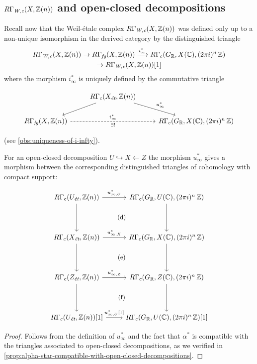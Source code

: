 \subsection*{$R\Gamma_\text{\it W,c} (X, \mathbb{Z} (n))$
  and open-closed decompositions}

Recall now that the Weil-étale complex $R\Gamma_\text{\it W,c} (X, \mathbb{Z} (n))$ was
defined only up to a non-unique isomorphism in the derived category by the
distinguished triangle
\begin{multline*}
  R\Gamma_\text{\it W,c} (X, \mathbb{Z} (n)) \to
  R\Gamma_\text{\it fg} (X, \mathbb{Z} (n)) \xrightarrow{i_\infty^*}
  R\Gamma_c (G_{\mathbb{R}}, X (\mathbb{C}), (2\pi i)^n\,\mathbb{Z}) \\
  \to R\Gamma_\text{\it W,c} (X, \mathbb{Z} (n)) [1]
\end{multline*}
where the morphism $i_\infty^*$ is uniquely defined by the commutative triangle

\[ \begin{tikzcd}
    & R\Gamma_c (X_\text{\it ét}, \ZZ (n))\ar{dl}\ar{dr}{u_\infty^*} \\
    R\Gamma_\text{\it fg} (X, \ZZ (n))\ar[dashed]{rr}{i_\infty^*}[swap]{\exists !} & & R\Gamma_c (G_\RR, X (\CC), (2\pi i)^n\,\ZZ)
  \end{tikzcd} \]

\noindent (see \ref{obs:uniqueness-of-i-infty}).

\begin{lemma}
  \label{eqn:u-infty-and-open-closed-triangles}
  For an open-closed decomposition $U \hookrightarrow X \leftarrow Z$ the
  morphism $u_\infty^*$ gives a morphism between the corresponding distinguished
  triangles of cohomology with compact support:

  \begin{equation}
    \label{eqn:u-infty-morphism-of-triangles}
    \begin{tikzcd}[row sep=4em]
      R\Gamma_c (U_\text{\it ét}, \ZZ (n))\ar{r}{u_{\infty,U}^*}\ar{d}\ar[phantom]{dr}{\text{\rm\small (d)}} & R\Gamma_c (G_\RR, U (\CC), (2\pi i)^n\,\ZZ)\ar{d} \\
      R\Gamma_c (X_\text{\it ét}, \ZZ (n))\ar{r}{u_{\infty,X}^*}\ar{d}\ar[phantom]{dr}{\text{\rm\small (e)}} & R\Gamma_c (G_\RR, X (\CC), (2\pi i)^n\,\ZZ)\ar{d} \\
      R\Gamma_c (Z_\text{\it ét}, \ZZ (n))\ar{r}{u_{\infty,Z}^*}\ar{d}\ar[phantom]{dr}{\text{\rm\small (f)}} & R\Gamma_c (G_\RR, Z (\CC), (2\pi i)^n\,\ZZ) \ar{d} \\
      R\Gamma_c (U_\text{\it ét}, \ZZ (n)) [1]\ar{r}{u_{\infty,U}^* [1]} & R\Gamma_c (G_\RR, U (\CC), (2\pi i)^n\,\ZZ) [1]
    \end{tikzcd}
  \end{equation}

  \begin{proof}
    Follows from the definition of $u_\infty^*$ and the fact that $\alpha^*$ is
    compatible with the triangles associated to open-closed decompositions, as
    we verified in
    \ref{prop:alpha-star-compatible-with-open-closed-decompositions}.
  \end{proof}
\end{lemma}

